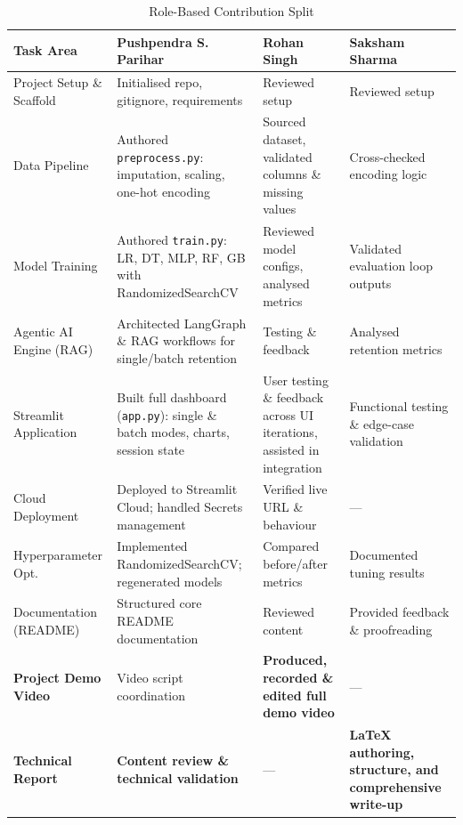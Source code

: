 \documentclass[12pt,a4paper]{article}
\begin{document}
\begin{table}[H]
\centering
\caption{Role-Based Contribution Split}
\begin{tabularx}{\textwidth}{lXXX}
    \toprule
    \textbf{Task Area} & \textbf{Pushpendra S. Parihar} & \textbf{Rohan Singh} & \textbf{Saksham Sharma} \\
    \midrule
    Project Setup \& Scaffold
        & Initialised repo, gitignore, requirements
        & Reviewed setup
        & Reviewed setup \\
    Data Pipeline
        & Authored \texttt{preprocess.py}: imputation, scaling, one-hot encoding
        & Sourced dataset, validated columns \& missing values
        & Cross-checked encoding logic \\
    Model Training
        & Authored \texttt{train.py}: LR, DT, MLP, RF, GB with RandomizedSearchCV
        & Reviewed model configs, analysed metrics
        & Validated evaluation loop outputs \\
    Agentic AI Engine (RAG)
        & Architected LangGraph \& RAG workflows for single/batch retention
        & Testing \& feedback
        & Analysed retention metrics \\
    Streamlit Application
        & Built full dashboard (\texttt{app.py}): single \& batch modes, charts, session state
        & User testing \& feedback across UI iterations, assisted in integration
        & Functional testing \& edge-case validation \\
    Cloud Deployment
        & Deployed to Streamlit Cloud; handled Secrets management
        & Verified live URL \& behaviour
        & — \\
    Hyperparameter Opt.
        & Implemented RandomizedSearchCV; regenerated models
        & Compared before/after metrics
        & Documented tuning results \\
    Documentation (README)
        & Structured core README documentation
        & Reviewed content
        & Provided feedback \& proofreading \\
    \textbf{Project Demo Video}
        & Video script coordination
        & \textbf{Produced, recorded \& edited full demo video}
        & — \\
    \textbf{Technical Report}
        & \textbf{Content review \& technical validation}
        & —
        & \textbf{LaTeX authoring, structure, and comprehensive write-up} \\
    \bottomrule
\end{tabularx}
\end{table}
\end{document}
